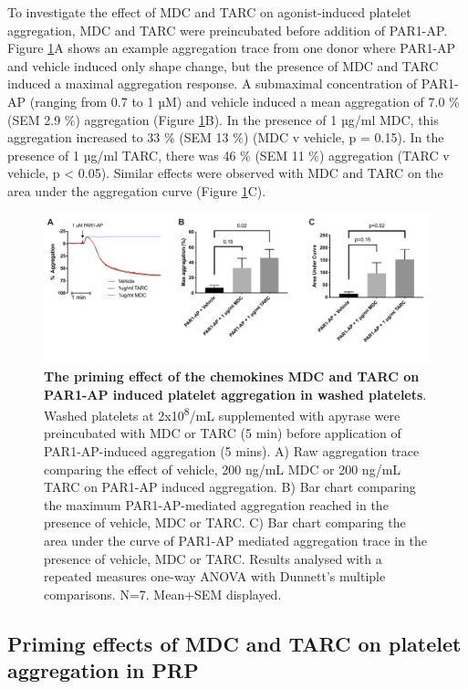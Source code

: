 \documentclass[11pt,twoside]{bristolthesis}
\begin{document}
To investigate the effect of MDC and TARC on agonist-induced platelet aggregation, MDC and TARC were preincubated before addition of PAR1-AP. Figure \ref{fig:MDC-TARC-agg}A shows an example aggregation trace from one donor where PAR1-AP and vehicle induced only shape change, but the presence of MDC and TARC induced a maximal aggregation response. A submaximal concentration of PAR1-AP (ranging from 0.7 to 1 µM) and vehicle induced a mean aggregation of 7.0 \% (SEM 2.9 \%) aggregation (Figure \ref{fig:MDC-TARC-agg}B). In the presence of 1 µg/ml MDC, this aggregation increased to 33 \% (SEM 13 \%) (MDC v vehicle, p = 0.15). In the presence of 1 µg/ml TARC, there was 46 \% (SEM 11 \%) aggregation (TARC v vehicle, p \textless{} 0.05). Similar effects were observed with MDC and TARC on the area under the aggregation curve (Figure \ref{fig:MDC-TARC-agg}C).



\begin{figure}

{\centering \includegraphics[width=0.95\linewidth]{figure/Chemokines/Layouts/MDC_TARC_aggregation_PAR1} 

}

\caption[The priming effect of the chemokines MDC and TARC on PAR1-AP induced platelet aggregation in washed platelets]{\textbf{The priming effect of the chemokines MDC and TARC on PAR1-AP induced platelet aggregation in washed platelets}. Washed platelets at 2x10\textsuperscript{8}/mL supplemented with apyrase were preincubated with MDC or TARC (5 min) before application of PAR1-AP-induced aggregation (5 mins). A) Raw aggregation trace comparing the effect of vehicle, 200 ng/mL MDC or 200 ng/mL TARC on PAR1-AP induced aggregation. B) Bar chart comparing the maximum PAR1-AP-mediated aggregation reached in the presence of vehicle, MDC or TARC. C) Bar chart comparing the area under the curve of PAR1-AP mediated aggregation trace in the presence of vehicle, MDC or TARC. Results analysed with a repeated measures one-way ANOVA with Dunnett's multiple comparisons. N=7. Mean+SEM displayed.}\label{fig:MDC-TARC-agg}
\end{figure}
\hypertarget{priming-effects-of-mdc-and-tarc-on-platelet-aggregation-in-prp}{%
\subsection{Priming effects of MDC and TARC on platelet aggregation in PRP}\label{priming-effects-of-mdc-and-tarc-on-platelet-aggregation-in-prp}}
\end{document}
